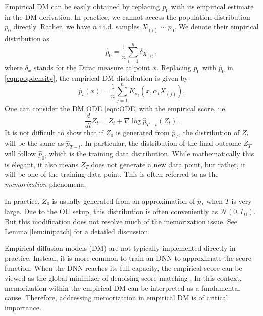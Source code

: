 \documentclass{article}
\def\phat{\hat{p}}
\begin{document}
Empirical DM can be easily obtained by replacing $p_0$ with its empirical estimate in the DM derivation.
In practice, we cannot access the population distribution $p_0$ directly. Rather, we have $n$ i.i.d. samples $X_{(i)}\sim p_0$. We denote their empirical distribution as 
\[
\phat_0=\frac{1}{n}\sum_{i=1}^n \delta_{X_{(i)}},
\]
where $\delta_x$ stands for the Dirac measure at point $x$. Replacing $p_0$ with $\phat_0$ in \eqref{eqn:popdensity}, the empirical DM distribution is given by 
\begin{equation}
\label{eqn:emDMdist}
\phat_t(x)=\frac1n\sum_{j=1}^n K_{\sigma_t}(x, \alpha_t X_{(j)}).
\end{equation}
One can consider the DM ODE \eqref{eqn:ODE} with the empirical score, i.e. 
\begin{equation}
\label{eqn:emDM}
\frac{d}{dt}Z_t=Z_t+\nabla \log \phat_{T-t}(Z_t).    
\end{equation}
It is not difficult to show that if $Z_0$ is generated from $\phat_T$, the distribution of $Z_t$ will be the same as $\phat_{T-t}$. In particular, the distribution of the final outcome $Z_T$ will follow $\phat_0$, which is the training data distribution. 
While mathematically this is elegant, it also means $Z_T$ does not generate a new data point, but rather, it will be one of the training data point. 
This is often referred to as the \emph{memorization} phenomena.

In practice, $Z_0$ is usually generated from an approximation of $\phat_T$ when $T$ is very large. Due to the OU setup, this distribution is often conveniently as $\mathcal{N}(0, I_D)$. But this modification does not resolve much of the memorization issue. See Lemma \ref{lem:inipatch} for a detailed discussion. 

Empirical diffusion models (DM) are not typically implemented directly in practice. Instead, it is more common to train an DNN to approximate the score function. When the DNN reaches its full capacity, the empirical score can be viewed as the global minimizer of denoising score matching \cite{li2024good, lu2023mathematical}. In this context, memorization within the empirical DM can be interpreted as a fundamental cause. Therefore, addressing memorization in empirical DM is of critical importance.
\end{document}
